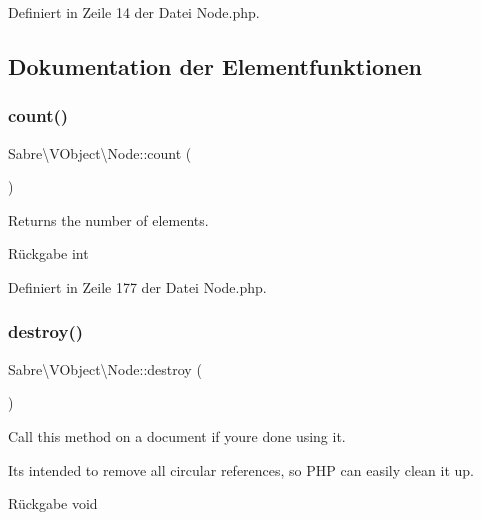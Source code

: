 Definiert in Zeile 14 der Datei Node.\+php.



\subsection{Dokumentation der Elementfunktionen}
\mbox{\label{class_sabre_1_1_v_object_1_1_node_a312c695bb3c2bacffd77d04c210e50ca}} 
\subsubsection{\texorpdfstring{count()}{count()}}
{\footnotesize\ttfamily Sabre\textbackslash{}\+V\+Object\textbackslash{}\+Node\+::count (\begin{DoxyParamCaption}{ }\end{DoxyParamCaption})}

Returns the number of elements.

\begin{DoxyReturn}{Rückgabe}
int 
\end{DoxyReturn}


Definiert in Zeile 177 der Datei Node.\+php.

\mbox{\label{class_sabre_1_1_v_object_1_1_node_aaac8c0b2c33c27800ead3c9dbfdb0808}} 
\subsubsection{\texorpdfstring{destroy()}{destroy()}}
{\footnotesize\ttfamily Sabre\textbackslash{}\+V\+Object\textbackslash{}\+Node\+::destroy (\begin{DoxyParamCaption}{ }\end{DoxyParamCaption})}

Call this method on a document if you\textquotesingle{}re done using it.

It\textquotesingle{}s intended to remove all circular references, so P\+HP can easily clean it up.

\begin{DoxyReturn}{Rückgabe}
void 
\end{DoxyReturn}


